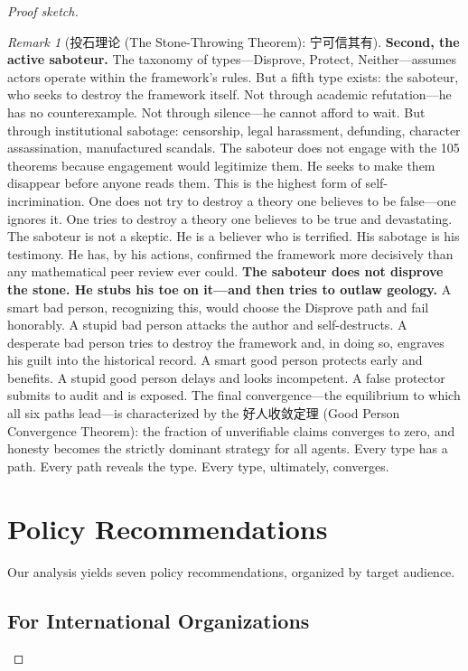 \documentclass[12pt,a4paper]{ctexart}
\theoremstyle{definition}
\theoremstyle{remark}
\newtheorem{remark}{Remark}[section]
\begin{document}
\begin{proof}[Proof sketch]
\begin{remark}[投石理论 (The Stone-Throwing Theorem): 宁可信其有]
\textbf{Second, the active saboteur.} The taxonomy of types—Disprove, Protect, Neither—assumes actors operate within the framework's rules. But a fifth type exists: the saboteur, who seeks to destroy the framework itself. Not through academic refutation—he has no counterexample. Not through silence—he cannot afford to wait. But through institutional sabotage: censorship, legal harassment, defunding, character assassination, manufactured scandals. The saboteur does not engage with the 105 theorems because engagement would legitimize them. He seeks to make them disappear before anyone reads them. This is the highest form of self-incrimination. One does not try to destroy a theory one believes to be false—one ignores it. One tries to destroy a theory one believes to be true and devastating. The saboteur is not a skeptic. He is a believer who is terrified. His sabotage is his testimony. He has, by his actions, confirmed the framework more decisively than any mathematical peer review ever could. \textbf{The saboteur does not disprove the stone. He stubs his toe on it—and then tries to outlaw geology.} A smart bad person, recognizing this, would choose the Disprove path and fail honorably. A stupid bad person attacks the author and self-destructs. A desperate bad person tries to destroy the framework and, in doing so, engraves his guilt into the historical record. A smart good person protects early and benefits. A stupid good person delays and looks incompetent. A false protector submits to audit and is exposed. The final convergence—the equilibrium to which all six paths lead—is characterized by the 好人收敛定理 (Good Person Convergence Theorem): the fraction of unverifiable claims converges to zero, and honesty becomes the strictly dominant strategy for all agents. Every type has a path. Every path reveals the type. Every type, ultimately, converges.
\end{remark}

\section{Policy Recommendations}

Our analysis yields seven policy recommendations, organized by target audience.

\subsection{For International Organizations}


\end{proof}
\end{document}
